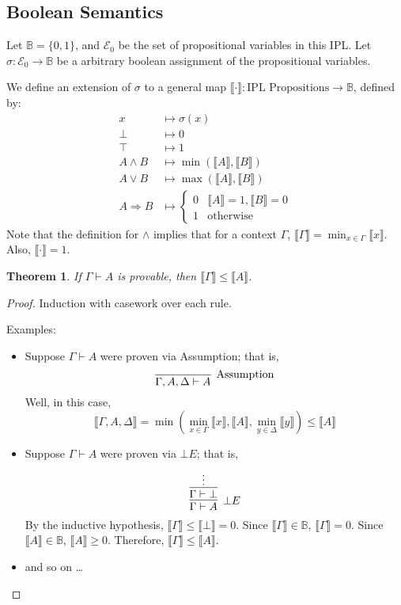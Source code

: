 \documentclass[12pt]{article}
\newtheorem{theorem}{Theorem}[section]
\newcommand{\db}[1]{\llbracket #1 \rrbracket}
\begin{document}
\subsection{Boolean Semantics}
Let $\mathbb{B} = \{0, 1\}$, and $\mathcal{E}_0$ be the set of propositional variables in this IPL. Let $\sigma: \mathcal{E}_0 \to \mathbb{B}$ be a arbitrary boolean assignment of the propositional variables.

We define an extension of $\sigma$ to a general map $\llbracket \cdot \rrbracket: \text{IPL Propositions} \to \mathbb{B}$, defined by:
\begin{align*}
x &\mapsto \sigma(x) \\
\bot &\mapsto 0 \\
\top &\mapsto 1 \\
A \land B &\mapsto \min(\db{A}, \db{B}) \\
A \lor B &\mapsto \max(\db{A}, \db{B}) \\
A \Rightarrow B &\mapsto \begin{cases}0 & \db{A} = 1, \db{B} = 0 \\ 1 & \text{otherwise}\end{cases}
\end{align*}
Note that the definition for $\land$ implies that for a context $\Gamma$, $\db{\Gamma} = \min_{x \in \Gamma}\db{x}$. Also, $\db{\cdot} = 1$.

\begin{theorem}\label{ProvableImpliesInequality}
If $\Gamma \vdash A$ is provable, then $\db{\Gamma} \leq \db{A}$.
\end{theorem}
\begin{proof}
Induction with casework over each rule.

Examples:
\begin{itemize}
    \item Suppose $\Gamma \vdash A$ were proven via Assumption; that is,
    \[\infer[\text{Assumption}]{\Gamma, A, \Delta \vdash A}{}\]
    Well, in this case,
    \[\db{\Gamma, A, \Delta} = \min(\min_{x \in \Gamma}\db{x}, \db{A}, \min_{y \in \Delta}\db{y}) \leq \db{A}\]
    \item Suppose $\Gamma \vdash A$ were proven via $\bot E$; that is,
    \[\infer[\bot E]{\Gamma \vdash A}{\infer{\Gamma \vdash \bot}{\vdots}}\]
    By the inductive hypothesis, $\db{\Gamma} \leq \db{\bot} = 0$. Since $\db{\Gamma} \in \mathbb{B}$, $\db{\Gamma} = 0$. Since $\db{A} \in \mathbb{B}$, $\db{A} \geq 0$. Therefore, $\db{\Gamma} \leq \db{A}$.
    \item and so on \dots
\end{itemize}
\end{proof}
\end{document}
